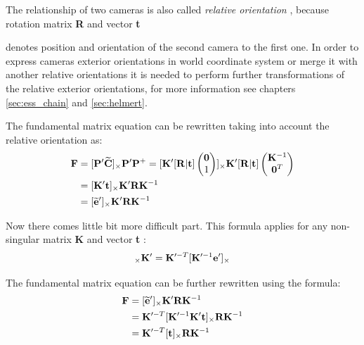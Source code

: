 \documentclass[a4paper,12pt]{article}
\newcommand{\ematr}[1]{
{\bf #1}
}
\newcommand{\evect}[1]{
{\bf #1}
}
\newcommand{\ehvect}[1]{
{\bf \widetilde{#1}}
}
\newcommand{\term}[1]{
{\it #1}
}
\begin{document}
The relationship of two cameras is also called \term{relative orientation}, because rotation matrix \ematr{R} and vector \evect{t}
denotes position and orientation of the second camera to the first one. In order to express cameras exterior orientations in world coordinate 
system or merge it with another relative orientations it is needed to perform further transformations of the relative 
exterior orientations, for more information see chapters \ref{sec:ess_chain} and \ref{sec:helmert}.

The fundamental matrix equation can be rewritten taking into account the relative orientation as:
\begin{equation}
\label{eg:funeq}
\begin{split}
\ematr{F}  &= [\ematr{P}'\ehvect{C}]_{\times} \ematr{P}'\ematr{P}^{+}
= [\ematr{K}' [\ematr{R}|\evect{t}]
\begin{pmatrix}
   \evect{0} \\
    1 \\
\end{pmatrix}]
_{\times} 
\ematr{K}' [\ematr{R}|\evect{t}]  
\begin{pmatrix}
   \evect{K}^{-1} \\
   \evect{0}^{T} \\
\end{pmatrix} \\
&= [\ematr{K}' \evect{t}]_{\times} \ematr{K}'\ematr{R}\ematr{K}^{-1} \\
&= [\ehvect{e}']_{\times} \ematr{K}'\ematr{R}\ematr{K}^{-1} 
\end{split}
\end{equation}

Now there comes little bit more difficult part.
This formula applies for any non-singular matrix \ematr{K} and vector \evect{t}:
\begin{equation}
[\evect{e}']_{\times} \ematr{K'} = \ematr{K}'^{-T}[\ematr{K}'^{-1}\evect{e}']_{\times}
\end{equation}

The fundamental matrix equation can be further rewritten using the formula:  
\begin{equation}
\begin{split}
\ematr{F}  &= [\ehvect{e}']_{\times} \ematr{K}' \ematr{R} \ematr{K}^{-1} \\
	   &= \ematr{K}'^{-T} [\ematr{K}'^{-1} \ematr{K}' \evect{t}]_{\times} \ematr{R} \ematr{K}^{-1} \\
	   &= \ematr{K}'^{-T} [\evect{t}]_{\times} \ematr{R} \ematr{K}^{-1}
\end{split}
\end{equation}
\end{document}
